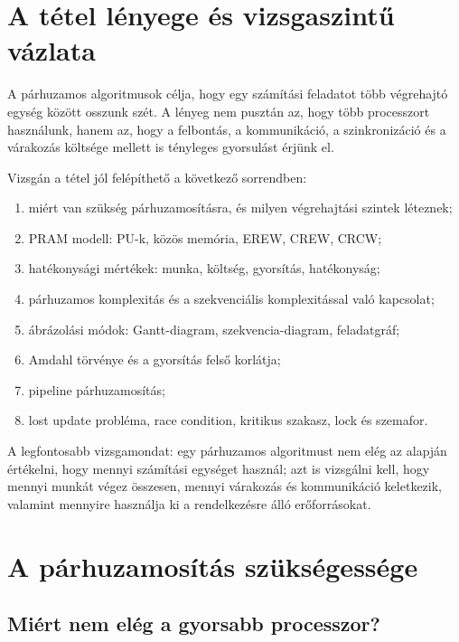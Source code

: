 \section{A tétel lényege és vizsgaszintű vázlata}

\begin{summarybox}
A párhuzamos algoritmusok célja, hogy egy számítási feladatot több végrehajtó egység között osszunk szét. A lényeg nem pusztán az, hogy több processzort használunk, hanem az, hogy a felbontás, a kommunikáció, a szinkronizáció és a várakozás költsége mellett is tényleges gyorsulást érjünk el.
\end{summarybox}

Vizsgán a tétel jól felépíthető a következő sorrendben:

\begin{enumerate}
  \item miért van szükség párhuzamosításra, és milyen végrehajtási szintek léteznek;
  \item PRAM modell: PU-k, közös memória, EREW, CREW, CRCW;
  \item hatékonysági mértékek: munka, költség, gyorsítás, hatékonyság;
  \item párhuzamos komplexitás és a szekvenciális komplexitással való kapcsolat;
  \item ábrázolási módok: Gantt-diagram, szekvencia-diagram, feladatgráf;
  \item Amdahl törvénye és a gyorsítás felső korlátja;
  \item pipeline párhuzamosítás;
  \item lost update probléma, race condition, kritikus szakasz, lock és szemafor.
\end{enumerate}

A legfontosabb vizsgamondat: egy párhuzamos algoritmust nem elég az alapján értékelni, hogy mennyi számítási egységet használ; azt is vizsgálni kell, hogy mennyi munkát végez összesen, mennyi várakozás és kommunikáció keletkezik, valamint mennyire használja ki a rendelkezésre álló erőforrásokat.

\section{A párhuzamosítás szükségessége}

\subsection{Miért nem elég a gyorsabb processzor?}

